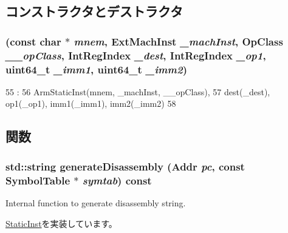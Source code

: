 \subsection{コンストラクタとデストラクタ}
\hypertarget{classRegRegImmImmOp64_a9fdd621bd5e4d003db45d00da6166dd7}{
\subsubsection[{RegRegImmImmOp64}]{ (const char $\ast$ {\em mnem}, \/  {\bf ExtMachInst} {\em \_\-machInst}, \/  OpClass {\em \_\-\_\-opClass}, \/  {\bf IntRegIndex} {\em \_\-dest}, \/  {\bf IntRegIndex} {\em \_\-op1}, \/  uint64\_\-t {\em \_\-imm1}, \/  uint64\_\-t {\em \_\-imm2})}}
\label{classRegRegImmImmOp64_a9fdd621bd5e4d003db45d00da6166dd7}



\begin{DoxyCode}
55                                                      :
56         ArmStaticInst(mnem, _machInst, __opClass),
57         dest(_dest), op1(_op1), imm1(_imm1), imm2(_imm2)
58     {}

\end{DoxyCode}


\subsection{関数}
\hypertarget{classRegRegImmImmOp64_a95d323a22a5f07e14d6b4c9385a91896}{
\subsubsection[{generateDisassembly}]{\setlength{\rightskip}{0pt plus 5cm}std::string generateDisassembly ({\bf Addr} {\em pc}, \/  const SymbolTable $\ast$ {\em symtab}) const}}
\label{classRegRegImmImmOp64_a95d323a22a5f07e14d6b4c9385a91896}
Internal function to generate disassembly string. 

\hyperlink{classStaticInst_ab4a569d2623620c04f8a52bbd91d63b9}{StaticInst}を実装しています。


